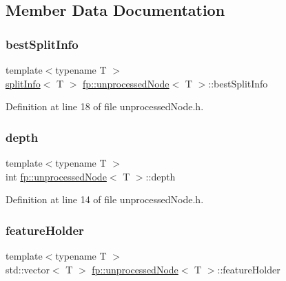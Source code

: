 \subsection{Member Data Documentation}
\mbox{\label{classfp_1_1unprocessedNode_ae60e5f84c9a80537cb84dfd17e70e893}} 
\subsubsection{\texorpdfstring{best\+Split\+Info}{bestSplitInfo}}
{\footnotesize\ttfamily template$<$typename T $>$ \\
\hyperlink{classfp_1_1splitInfo}{split\+Info}$<$ T $>$ \hyperlink{classfp_1_1unprocessedNode}{fp\+::unprocessed\+Node}$<$ T $>$\+::best\+Split\+Info\hspace{0.3cm}{\ttfamily [protected]}}



Definition at line 18 of file unprocessed\+Node.\+h.

\mbox{\label{classfp_1_1unprocessedNode_a22ebfbc35a57e2d30b81220c94f4d0d3}} 
\subsubsection{\texorpdfstring{depth}{depth}}
{\footnotesize\ttfamily template$<$typename T $>$ \\
int \hyperlink{classfp_1_1unprocessedNode}{fp\+::unprocessed\+Node}$<$ T $>$\+::depth\hspace{0.3cm}{\ttfamily [protected]}}



Definition at line 14 of file unprocessed\+Node.\+h.

\mbox{\label{classfp_1_1unprocessedNode_ac2a435f6f38c5c0d2b4ba4b721fd5eaa}} 
\subsubsection{\texorpdfstring{feature\+Holder}{featureHolder}}
{\footnotesize\ttfamily template$<$typename T $>$ \\
std\+::vector$<$ T $>$ \hyperlink{classfp_1_1unprocessedNode}{fp\+::unprocessed\+Node}$<$ T $>$\+::feature\+Holder\hspace{0.3cm}{\ttfamily [protected]}}



